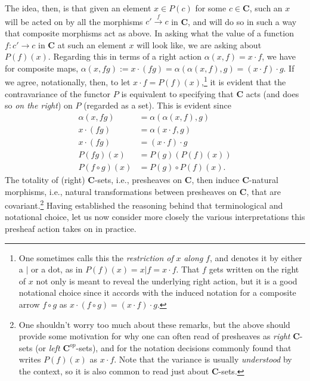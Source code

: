 \documentclass[11pt]{book}
\theoremstyle{definition}
\theoremstyle{definition}
\theoremstyle{definition}
\theoremstyle{theorem}
\theoremstyle{definition}
\begin{document}
The idea, then, is that given an element $x \in P(c)$ for some $c \in \textbf{C}$, such an $x$ will be acted on by all the morphisms $c' \xrightarrow{f} c$ in \textbf{C}, and will do so in such a way that composite morphisms act as above. In asking what the value of a function $f: c' \rightarrow c$ in \textbf{C} at such an element $x$ will look like, we are asking about $P(f)(x)$. Regarding this in terms of a right action $\alpha(x,f) = x \cdot f$, we have for composite maps, $\alpha(x, fg) := x \cdot (fg) = \alpha(\alpha(x,f), g) = (x \cdot f) \cdot g$. If we agree, notationally, then, to let $x \cdot f = P(f)(x)$,\footnote{One sometimes calls this the \textit{restriction of} $x$ \textit{along} $f$, and denotes it by either a $|$ or a dot, as in $P(f)(x) = x|f = x \cdot f$. That $f$ gets written on the right of $x$ not only is meant to reveal the underlying right action, but it is a good notational choice since it accords with the induced notation for a composite arrow $f \circ g$ as $x \cdot (f \circ g) = (x \cdot f) \cdot g$.} it is evident that the contravariance of the functor $P$ is equivalent to specifying that \textbf{C} acts (and does so \textit{on the right}) on $P$ (regarded as a set). This is evident since 
\begin{equation*}
\begin{split} 
\alpha(x, fg) & = \alpha(\alpha(x,f), g) \\  
x \cdot (fg) & = \alpha (x \cdot f, g)  \\ 
x \cdot (fg) & = (x \cdot f) \cdot g  \\
P(fg)(x) & = P(g)(P(f)(x)) \\ 
P(f \circ g)(x) & = P(g) \circ P(f)(x) .   
\end{split} 
\end{equation*}
The totality of (right) \textbf{C}-sets, i.e., presheaves on \textbf{C}, then induce \textbf{C}-natural morphisms, i.e., natural transformations between presheaves on \textbf{C}, that are covariant.\footnote{One shouldn't worry too much about these remarks, but the above should provide some motivation for why one can often read of presheaves as \textit{right} \textbf{C}-sets (or \textit{left} $\textbf{C}^{op}$-sets), and for the notation decisions commonly found that writes $P(f)(x)$ as $x\cdot f$. Note that the variance is usually \textit{understood} by the context, so it is also common to read just about \textbf{C}-sets.} Having established the reasoning behind that terminological and notational choice, let us now consider more closely the various interpretations this presheaf action takes on in practice.  
\end{document}
